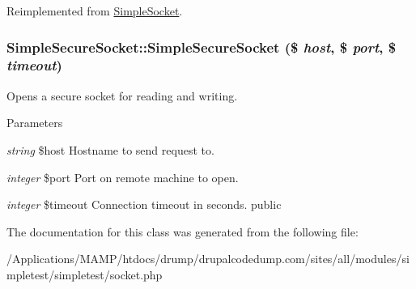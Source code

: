 Reimplemented from \hyperlink{class_simple_socket_a40c391808591c437200a14ebb2619f83}{SimpleSocket}.\hypertarget{class_simple_secure_socket_ae86a1994aa38db0aad3ff3779c0907b7}{
\subsubsection[{SimpleSecureSocket}]{\setlength{\rightskip}{0pt plus 5cm}SimpleSecureSocket::SimpleSecureSocket (\$ {\em host}, \/  \$ {\em port}, \/  \$ {\em timeout})}}
\label{class_simple_secure_socket_ae86a1994aa38db0aad3ff3779c0907b7}
Opens a secure socket for reading and writing. 
\begin{DoxyParams}{Parameters}
\item[{\em string}]\$host Hostname to send request to. \item[{\em integer}]\$port Port on remote machine to open. \item[{\em integer}]\$timeout Connection timeout in seconds.  public \end{DoxyParams}


The documentation for this class was generated from the following file:\begin{DoxyCompactItemize}
\item 
/Applications/MAMP/htdocs/drump/drupalcodedump.com/sites/all/modules/simpletest/simpletest/socket.php\end{DoxyCompactItemize}
